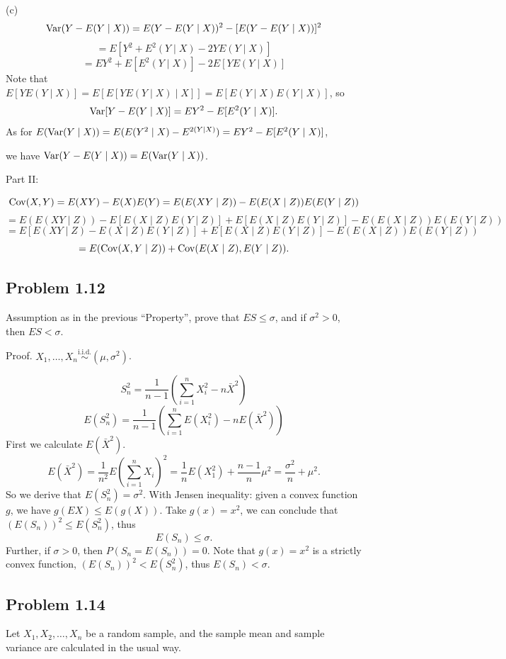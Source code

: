 (c)
\[
\operatorname{Var}(Y-E(Y\mid X))=E(Y-E(Y\mid X))^{2}-[E(Y-E(Y\mid X))]^{2}
\]
\[
=E[Y^{2}+E^{2}(Y\mid X)-2YE(Y\mid X)]
\]
\[
=EY^{2}+E[E^{2}(Y\mid X)]-2E[YE(Y\mid X)]
\]
Note that $E[YE(Y\mid X)]=E[E[YE(Y\mid X)\mid X]]=E[E(Y\mid X)E(Y\mid X)]$, so
\[
\operatorname{Var}[Y-E(Y\mid X)]=EY^{2}-E[E^{2}(Y\mid X)].
\]
As for $E(\operatorname{Var}(Y\mid X))=E(E(Y^{2}\mid X)-E^{2(Y\mid X)})=EY^{2}-E[E^{2}(Y\mid X)]$,

we have $\operatorname{Var}(Y-E(Y\mid X))=E(\operatorname{Var}(Y\mid X))$.

Part II:

\[
\operatorname{Cov}(X,Y)=E(XY)-E(X)E(Y)=E(E(XY\mid Z))-E(E(X\mid Z))E(E(Y\mid Z))
\]
\[
=E(E(XY\mid Z))-E[E(X\mid Z)E(Y\mid Z)]+E[E(X\mid Z)E(Y\mid Z)]-E(E(X\mid Z))E(E(Y\mid Z))
\]
\[
=E[E(XY\mid Z)-E(X\mid Z)E(Y\mid Z)]+E[E(X\mid Z)E(Y\mid Z)]-E(E(X\mid Z))E(E(Y\mid Z))
\]
\[
=E(\operatorname{Cov}(X,Y\mid Z))+\operatorname{Cov}(E(X\mid Z),E(Y\mid Z)).
\]

\subsection*{Problem 1.12}
Assumption as in the previous ``Property'', prove that $ES\leq\sigma$, and if $\sigma^{2}>0$, then $ES<\sigma$.

{Proof.}
$X_{1},\ldots,X_{n}\stackrel{\text{i.i.d.}}{\sim}(\mu,\sigma^{2})$.

\[
S_{n}^{2}=\frac{1}{n-1}\left(\sum_{i=1}^{n}X_{i}^{2}-n\bar{X}^{2}\right)
\]
\[
E(S_{n}^{2})=\frac{1}{n-1}\left(\sum_{i=1}^{n}E(X_{i}^{2})-nE(\bar{X}^{2})\right)
\]
First we calculate $E\left(\bar{X}^{2}\right)$.
\[
E\left(\bar{X}^{2}\right)=\frac{1}{n^{2}}E\left(\sum_{i=1}^{n}X_{i}\right)^{2}=\frac{1}{n}E\left(X_{1}^{2}\right)+\frac{n-1}{n}\mu^{2}=\frac{\sigma^{2}}{n}+\mu^{2}.
\]
So we derive that $E\left(S_{n}^{2}\right)=\sigma^{2}$. With Jensen inequality: given a convex function $g$, we have $g(EX)\leq E(g(X))$. Take $g(x)=x^{2}$, we can conclude that $\left(E\left(S_{n}\right)\right)^{2}\leq E\left(S_{n}^{2}\right)$, thus
\[
E\left(S_{n}\right)\leq\sigma.
\]
Further, if $\sigma>0$, then $P\left(S_{n}=E\left(S_{n}\right)\right)=0$. Note that $g(x)=x^{2}$ is a strictly convex function, $\left(E\left(S_{n}\right)\right)^{2}<E\left(S_{n}^{2}\right)$, thus $E\left(S_{n}\right)<\sigma$.

\subsection*{Problem 1.14}
Let $X_{1},X_{2},\ldots,X_{n}$ be a random sample, and the sample mean and sample variance are calculated in the usual way.

